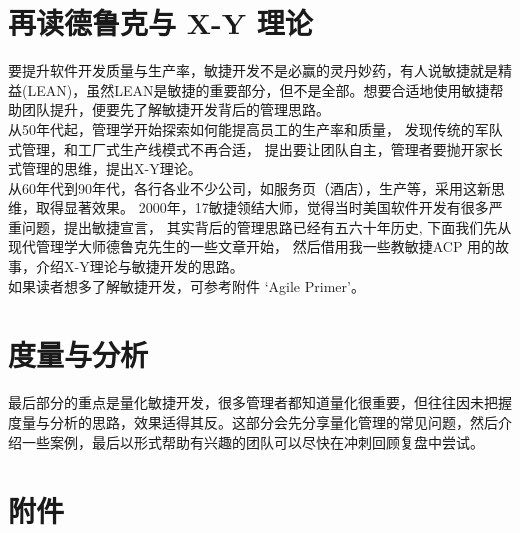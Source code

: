 \documentclass{book}        %
\begin{document}

\part{再读德鲁克与 X-Y 理论}要提升软件开发质量与生产率，敏捷开发不是必赢的灵丹妙药，有人说敏捷就是精益(LEAN)，虽然LEAN是敏捷的重要部分，但不是全部。想要合适地使用敏捷帮助团队提升，便要先了解敏捷开发背后的管理思路。\\

从50年代起，管理学开始探索如何能提高员工的生产率和质量， 发现传统的军队式管理，和工厂式生产线模式不再合适， 提出要让团队自主，管理者要抛开家长式管理的思维，提出X-Y理论。\\

从60年代到90年代，各行各业不少公司，如服务页（酒店），生产等，采用这新思维，取得显著效果。 2000年，17敏捷领结大师，觉得当时美国软件开发有很多严重问题，提出敏捷宣言， 其实背后的管理思路已经有五六十年历史, 下面我们先从现代管理学大师德鲁克先生的一些文章开始， 然后借用我一些教敏捷ACP 用的故事，介绍X-Y理论与敏捷开发的思路。\\

如果读者想多了解敏捷开发，可参考附件 ‘Agile Primer’。 \\
 
\part{度量与分析}最后部分的重点是量化敏捷开发，很多管理者都知道量化很重要，但往往因未把握度量与分析的思路，效果适得其反。这部分会先分享量化管理的常见问题，然后介绍一些案例，最后以形式帮助有兴趣的团队可以尽快在冲刺回顾复盘中尝试。\\



\part{附件}
\appendix





%

\end{document}
